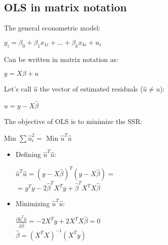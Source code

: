 \documentclass[10pt, a4paper, landscape]{extarticle}
\begin{document}
\begin{multicols}{3}
\section*{OLS in matrix notation}
	The general econometric model:
	\begin{center}
		$y_i = \beta_0 + \beta_1 x_{1i} + ... + \beta_k x_{ki} + u_i$
	\end{center}
	Can be written in matrix notation as:
	\begin{center}
		$y = X \beta + u$
	\end{center}
	Let's call $\hat{u}$ the vector of estimated residuals ($\hat{u} \neq u$):
	\begin{center}
		$\hat{u} = y - X \hat{\beta}$
	\end{center}
	The objective of OLS is to minimize the SSR:
	\begin{center}
		Min $\sum \hat{u}_i^2 = $ Min $\hat{u}^T \hat{u}$
	\end{center}
	\begin{itemize}[leftmargin=*]
		\item Defining $\hat{u}^T \hat{u}$:
		\begin{center}
			$\hat{u}^T \hat{u} = (y - X \hat{\beta})^T (y - X \hat{\beta}) =$
			\\ $= y^T y -2 \hat{\beta}^T X^T y + \hat{\beta}^T X^T X \hat{\beta}$
		\end{center}
		\item Minimizing $\hat{u}^T \hat{u}$:
		\begin{center}
			$\frac{\partial \hat{u}^T \hat{u}}{\partial \hat{\beta}} = -2 X^T y +2 X^T X \hat{\beta} = 0$
			\\ $\hat{\beta} = (X^T X)^{-1} (X^T y)$
			\\ 
		\end{center}
	\end{itemize}

\end{multicols}
\end{document}
